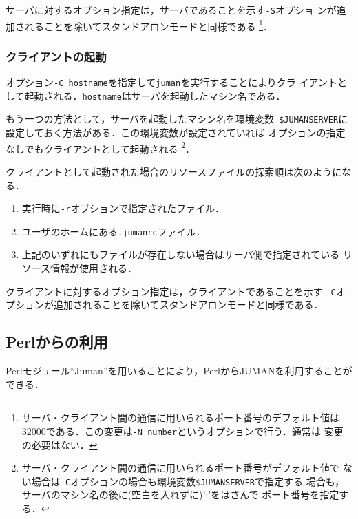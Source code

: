 \documentclass[a4j,titlepage]{jarticle}
\begin{document}
サーバに対するオプション指定は，サーバであることを示す{\tt -S}オプショ
ンが追加されることを除いてスタンドアロンモードと同様である%
\footnote{
  サーバ・クライアント間の通信に用いられるポート番号のデフォルト値は
  32000である．この変更は{\tt -N number}というオプションで行う．通常は
  変更の必要はない．
}．

\subsubsection{クライアントの起動}

オプション{\tt -C hostname}を指定して{\tt juman}を実行することによりクラ
イアントとして起動される．{\tt hostname}はサーバを起動したマシン名である．

もう一つの方法として，サーバを起動したマシン名を環境変数{\tt
\$JUMANSERVER}に設定しておく方法がある．この環境変数が設定されていれば
オプションの指定なしでもクライアントとして起動される%
\footnote{
  サーバ・クライアント間の通信に用いられるポート番号がデフォルト値で
  ない場合は{\tt -C}オプションの場合も環境変数{\tt \$JUMANSERVER}で指定する
  場合も，サーバのマシン名の後に(空白を入れずに)':'をはさんで
  ポート番号を指定する．
}．

クライアントとして起動された場合のリソースファイルの探索順は次のようになる．
\begin{enumerate}
\item 実行時に{\tt -r}オプションで指定されたファイル．
\item ユーザのホームにある{\tt .jumanrc}ファイル．
\item 上記のいずれにもファイルが存在しない場合はサーバ側で指定されている
  リソース情報が使用される．
\end{enumerate}

クライアントに対するオプション指定は，クライアントであることを示す
{\tt -C}オプションが追加されることを除いてスタンドアロンモードと同様である．

\subsection{Perlからの利用}

Perlモジュール``Juman''を用いることにより，PerlからJUMANを利用することが
できる．
\end{document}

